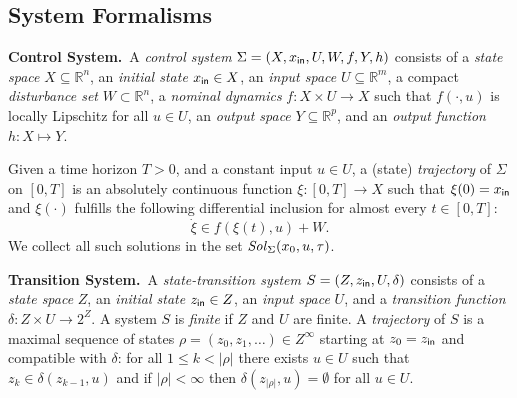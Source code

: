 
\subsection{System Formalisms}
 
\smallskip
\noindent\textbf{Control System.}\
A \emph{control system} $\Sigma = (X, x_{\mathsf{in}}, U, W, f, Y, h)$
consists of a \emph{state space} $X\subseteq \mathbb{R}^n$,
an \emph{initial state} $x_{\mathsf{in}}\in X$,
 an \emph{input space} $U\subseteq\mathbb{R}^m$, 
a compact \emph{disturbance set} $W\subset \mathbb{R}^n$, 
a \emph{nominal dynamics} $f:X\times U\rightarrow X$ such that $f(\cdot,u)$ is locally Lipschitz for all $u\in U$,
an \emph{output space} $Y\subseteq \mathbb{R}^p$, and
an \emph{output function} $h\colon X\mapsto Y$. 
%

Given a time horizon $T>0$, and a constant input $u\in U$, 
a (state) \emph{trajectory} of $\Sigma$ 
on $[0,T]$ is an absolutely continuous function $\xi:[0,T]\rightarrow X$  such that $\xi(0) = x_{\mathsf{in}}$ and
$\xi(\cdot)$ fulfills the following differential inclusion for almost every $t\in[0,T]$:
\begin{equation}\label{equ:def_f}
 \dot{\xi}\in f(\xi(t),u) + W. 
\end{equation} 
We collect all such solutions in the set $\mathit{Sol}_\Sigma(x_0,u,\tau)$. 

\smallskip
\noindent\textbf{Transition System.}\
A \emph{state-transition system} $S=(Z,z_{\mathsf{in}},U,\delta)$ consists of a \emph{state space} $Z$, an \emph{initial state} $z_{\mathsf{in}}\in Z$, an \emph{input space} $U$, and a \emph{transition function} $\delta:Z\times U \rightarrow 2^Z$. 
A system $S$ is \emph{finite} if $Z$ and $U$ are finite. 
A \emph{trajectory} of $S$ is a maximal sequence of states $\rho = (z_0,z_1,\ldots) \in Z^\infty$ starting at $z_0=z_{\mathsf{in}}$ and compatible with $\delta$:
for all $1\leq k < |\rho|$ there exists $u\in U$ such that $z_k\in \delta(z_{k-1},u)$ and 
if $|\rho| < \infty$ then $\delta(z_{|\rho|},u)= \emptyset$ for all $u\in U$.


